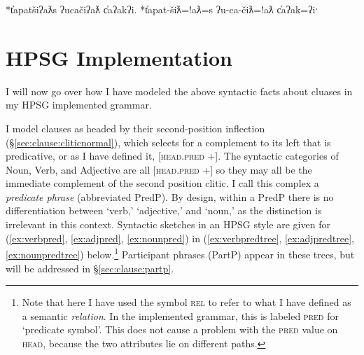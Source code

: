 *t̓apatšiʔaƛs ʔucačiʔaƛ c̓aʔakʔi.
*t̓apat-šiƛ=!aƛ=s ʔu-ca-čiƛ=!aƛ c̓aʔak=ʔiˑ




\section{HPSG Implementation} \label{sec:clause:implementation}

I will now go over how I have modeled the above syntactic facts about cluases in my HPSG implemented grammar. 

I model clauses as headed by their second-position inflection (\S\ref{sec:clause:cliticnormal}), which selects for a complement to its left that is predicative, or as I have defined it, [\textsc{head.pred} +]. The syntactic categories of Noun, Verb, and Adjective are all [\textsc{head.pred} +] so they may all be the immediate complement of the second position clitic. I call this complex a \textit{predicate phrase} (abbreviated PredP). By design, within a PredP there is no differentiation between `verb,' `adjective,' and `noun,' as the distinction is irrelevant in this context. Syntactic sketches in an HPSG style are given for (\ref{ex:verbpred}, \ref{ex:adjpred}, \ref{ex:nounpred}) in (\ref{ex:verbpredtree}, \ref{ex:adjpredtree}, \ref{ex:nounpredtree}) below.\footnote{Note that here I have used the symbol \textsc{rel} to refer to what I have defined as a semantic \textit{relation}. In the implemented grammar, this is labeled \textsc{pred} for `predicate symbol'. This does not cause a problem with the \textsc{pred} value on \textsc{head}, because the two attributes lie on different paths.} Participant phrases (PartP) appear in these trees, but will be addressed in \S\ref{sec:clause:partp}. 

